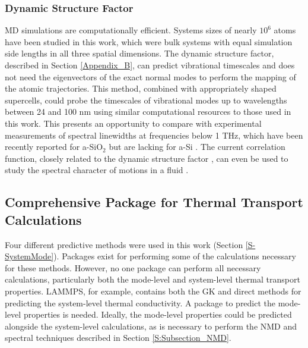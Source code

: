 \subsubsection{\label{Future:Timescales:DSF}
Dynamic Structure Factor}

MD simulations are computationally efficient.  Systems sizes of nearly 
$10^6$ atoms have been studied in this work, which were bulk systems 
with equal simulation side lengths in all three spatial dimensions. 
The dynamic structure factor, described in Section \ref{Appendix_B}, 
can predict vibrational timescales and does not 
need the eigenvectors of the exact normal modes to perform the mapping 
of the atomic trajectories. This method, 
combined with appropriately shaped supercells, could probe the 
timescales of vibrational modes up to wavelengths between 
24 and 100 nm using similar computational resources to those 
used in this work. 
This presents an opportunity to compare with experimental 
measurements of spectral linewidths at frequencies below 
1 THz, which have been recently reported for a-SiO$_2$
\cite{masciovecchio_evidence_2006,baldi_sound_2010,baldi_high_2011,
baldi_emergence_2013}
but are 
lacking for a-Si \cite{hondongwa_ultrasonic_2011}. 
The current correlation function, closely related to the dynamic 
structure factor \cite{horbach_high_2001}, can even be used to study 
the spectral character of motions in a fluid \cite{boom_molecular_1980}.  

\subsection{\label{Future:Package}
Comprehensive Package for Thermal Transport Calculations}

Four different predictive methods were used in this work (Section 
\ref{S-SystemMode}). 
Packages exist for performing some of the calculations 
necessary for these methods. However, no one package can perform all 
necessary calculations, particularly both the 
mode-level and system-level thermal transport 
properties. 
LAMMPS, for example, contains both the GK and direct methods for 
predicting the 
system-level thermal conductivity. A package to predict the 
mode-level properties is needed.  Ideally, the mode-level properties 
could be predicted alongside the system-level calculations, as is 
necessary to perform the NMD and spectral techniques described in 
Section \ref{S:Subsection_NMD}. 

